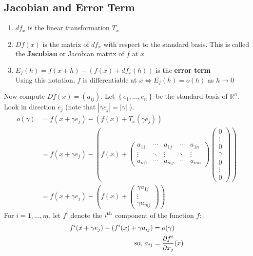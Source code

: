 \documentclass[11pt]{elegantbook}
\begin{document}
\subsection{Jacobian and Error Term}
\begin{definition}
    \normalfont
\begin{enumerate}[$\circ$]
    \item $d f_x$ is the linear transformation $T_x$
    \item $D f(x)$ is the matrix of $d f_x$ with respect to the standard basis. This is called the \textbf{Jacobian} or Jacobian matrix of $f$ at $x$
    \item $E_f(h)=f(x+h)-\left(f(x)+d f_x(h)\right)$ is the \textbf{error term}\\
    Using this notation, $f$ is differentiable at $x \Leftrightarrow E_f(h)=o(h)$ as $h \rightarrow 0$
\end{enumerate}
\end{definition}
Now compute $D f(x)=\left(a_{i j}\right)$. Let $\left\{e_1, \ldots, e_n\right\}$ be the standard basis of $\mathbb{R}^n$. Look in direction $e_j$ (note that $\left|\gamma e_j\right|=|\gamma|$ ).
$$
\begin{aligned}
o(\gamma)&=f\left(x+\gamma e_j\right)-\left(f(x)+T_x\left(\gamma e_j\right)\right) \\
&=f\left(x+\gamma e_j\right)-\left(f(x)+\left(\begin{array}{ccccc}
a_{11} & \cdots & a_{1 j} & \cdots & a_{1 n} \\
\vdots & \ddots & \vdots & \ddots & \vdots \\
a_{m 1} & \cdots & a_{m j} & \cdots & a_{m n}
\end{array}\right)\left(\begin{array}{c}
0 \\
\vdots \\
0 \\
\gamma \\
0 \\
\vdots \\
0
\end{array}\right)\right) \\
&=f\left(x+\gamma e_j\right)-\left(f(x)+\left(\begin{array}{c}
\gamma a_{1 j} \\
\vdots \\
\gamma a_{m j}
\end{array}\right)\right)
\end{aligned}
$$
For $i = 1, . . . , m$, let $f^i$ denote the $i^\textnormal{th}$ component of the function $f$:
\begin{equation}
    \begin{aligned}
        f^i(x+\gamma e_j)-(f^i(x)+\gamma a_{ij})&=o(\gamma)\\
        \textnormal{so, }a_{ij}&=\frac{\partial f^i}{\partial x_j}(x)
    \end{aligned}
    \nonumber
\end{equation}
\end{document}
